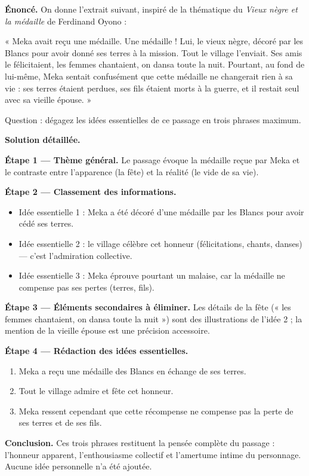 \documentclass[11pt]{article}
\begin{document}
\begin{exoresolu}
\textbf{Énoncé.} On donne l'extrait suivant, inspiré de la thématique du \emph{Vieux nègre et la médaille} de Ferdinand Oyono :

« Meka avait reçu une médaille. Une médaille ! Lui, le vieux nègre, décoré par les Blancs pour avoir donné ses terres à la mission. Tout le village l'enviait. Ses amis le félicitaient, les femmes chantaient, on dansa toute la nuit. Pourtant, au fond de lui-même, Meka sentait confusément que cette médaille ne changerait rien à sa vie : ses terres étaient perdues, ses fils étaient morts à la guerre, et il restait seul avec sa vieille épouse. »

Question : dégagez les idées essentielles de ce passage en trois phrases maximum.

\tcblower
\textbf{Solution détaillée.}

\textbf{Étape 1 — Thème général.} Le passage évoque la médaille reçue par Meka et le contraste entre l'apparence (la fête) et la réalité (le vide de sa vie).

\textbf{Étape 2 — Classement des informations.}
\begin{itemize}
\item Idée essentielle 1 : Meka a été décoré d'une médaille par les Blancs pour avoir cédé ses terres.
\item Idée essentielle 2 : le village célèbre cet honneur (félicitations, chants, danses) — c'est l'admiration collective.
\item Idée essentielle 3 : Meka éprouve pourtant un malaise, car la médaille ne compense pas ses pertes (terres, fils).
\end{itemize}

\textbf{Étape 3 — Éléments secondaires à éliminer.} Les détails de la fête (« les femmes chantaient, on dansa toute la nuit ») sont des illustrations de l'idée 2 ; la mention de la vieille épouse est une précision accessoire.

\textbf{Étape 4 — Rédaction des idées essentielles.}
\begin{enumerate}
\item Meka a reçu une médaille des Blancs en échange de ses terres.
\item Tout le village admire et fête cet honneur.
\item Meka ressent cependant que cette récompense ne compense pas la perte de ses terres et de ses fils.
\end{enumerate}

\textbf{Conclusion.} Ces trois phrases restituent la pensée complète du passage : l'honneur apparent, l'enthousiasme collectif et l'amertume intime du personnage. Aucune idée personnelle n'a été ajoutée.
\end{exoresolu}
\end{document}
